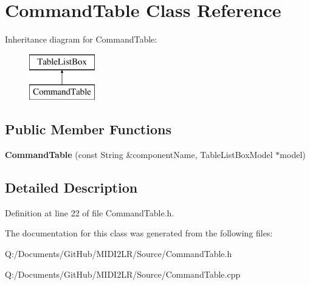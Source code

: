\hypertarget{class_command_table}{}\section{Command\+Table Class Reference}
\label{class_command_table}
Inheritance diagram for Command\+Table\+:\begin{figure}[H]
\begin{center}
\leavevmode
\includegraphics[height=2.000000cm]{class_command_table}
\end{center}
\end{figure}
\subsection*{Public Member Functions}
\begin{DoxyCompactItemize}
\item 
{\bfseries Command\+Table} (const String \&component\+Name, Table\+List\+Box\+Model $\ast$model)\hypertarget{class_command_table_ab59f0a5853c0de7a5812291cbf5ff5af}{}\label{class_command_table_ab59f0a5853c0de7a5812291cbf5ff5af}

\end{DoxyCompactItemize}


\subsection{Detailed Description}


Definition at line 22 of file Command\+Table.\+h.



The documentation for this class was generated from the following files\+:\begin{DoxyCompactItemize}
\item 
Q\+:/\+Documents/\+Git\+Hub/\+M\+I\+D\+I2\+L\+R/\+Source/Command\+Table.\+h\item 
Q\+:/\+Documents/\+Git\+Hub/\+M\+I\+D\+I2\+L\+R/\+Source/Command\+Table.\+cpp\end{DoxyCompactItemize}
